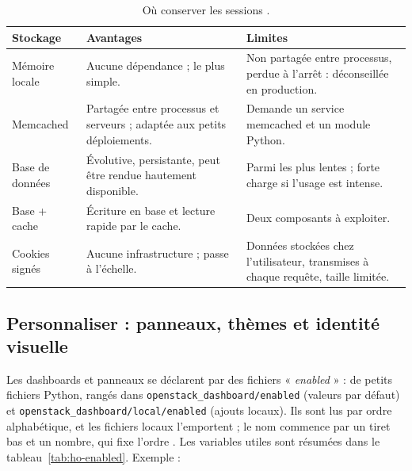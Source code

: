 \begin{table}[!ht]
\centering
\renewcommand{\arraystretch}{1.3}
\begin{tabular}{@{}>{\raggedright\arraybackslash}p{3.2cm}>{\raggedright\arraybackslash}p{6.0cm}>{\raggedright\arraybackslash}p{6.3cm}@{}}
\toprule
\textbf{Stockage} & \textbf{Avantages} & \textbf{Limites} \\
\midrule
Mémoire locale & Aucune dépendance ; le plus simple. & Non partagée entre processus, perdue à l'arrêt : déconseillée en production. \\
Memcached & Partagée entre processus et serveurs ; adaptée aux petits déploiements. & Demande un service memcached et un module Python. \\
Base de données & Évolutive, persistante, peut être rendue hautement disponible. & Parmi les plus lentes ; forte charge si l'usage est intense. \\
Base + cache & Écriture en base et lecture rapide par le cache. & Deux composants à exploiter. \\
Cookies signés & Aucune infrastructure ; passe à l'échelle. & Données stockées chez l'utilisateur, transmises à chaque requête, taille limitée. \\
\bottomrule
\end{tabular}
\caption{Où conserver les sessions \parencite{horizon-sessions}.}
\label{tab:ho-sessions}
\end{table}

\subsection{Personnaliser : panneaux, thèmes et identité visuelle}\label{sec:ho-perso}

Les dashboards et panneaux se déclarent par des fichiers « \emph{enabled} » : de petits fichiers Python, rangés dans
\texttt{openstack\_\allowbreak dashboard/enabled} (valeurs par défaut) et \texttt{openstack\_\allowbreak dashboard/local/enabled} (ajouts locaux). Ils sont lus par
ordre alphabétique, et les fichiers locaux l'emportent ; le nom commence par un tiret bas et un nombre, qui fixe l'ordre
\parencite{horizon-panels}. Les variables utiles sont résumées dans le tableau~\ref{tab:ho-enabled}. Exemple :

